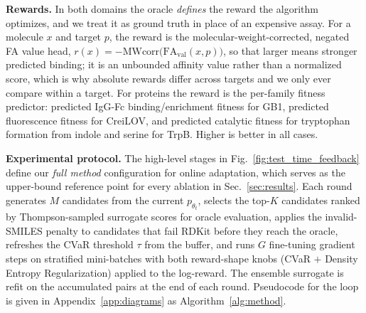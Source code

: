 \textbf{Rewards.} In both domains the oracle \emph{defines} the reward the algorithm optimizes, and we treat it as ground truth in place of an expensive assay. For a molecule $x$ and target $p$, the reward is the molecular-weight-corrected, negated FA value head, $r(x) = -\mathrm{MWcorr}\bigl(\mathrm{FA}_{\text{val}}(x, p)\bigr)$, so that larger means stronger predicted binding; it is an unbounded affinity value rather than a normalized score, which is why absolute rewards differ across targets and we only ever compare within a target. For proteins the reward is the per-family fitness predictor: predicted IgG-Fc binding/enrichment fitness for GB1, predicted fluorescence fitness for CreiLOV, and predicted catalytic fitness for tryptophan formation from indole and serine for TrpB. Higher is better in all cases.


\textbf{Experimental protocol.} The high-level stages in Fig.~\ref{fig:test_time_feedback} define our \emph{full method} configuration for online adaptation, which serves as the upper-bound reference point for every ablation in Sec.~\ref{sec:results}. Each round generates $M$ candidates from the current $p_{\theta_t}$, selects the top-$K$ candidates ranked by Thompson-sampled surrogate scores for oracle evaluation, applies the invalid-SMILES penalty to candidates that fail RDKit before they reach the oracle, refreshes the CVaR threshold $\tau$ from the buffer, and runs $G$ fine-tuning gradient steps on stratified mini-batches with both reward-shape knobs (CVaR $+$ Density Entropy Regularization) applied to the log-reward. The ensemble surrogate is refit on the accumulated pairs at the end of each round. Pseudocode for the loop is given in Appendix~\ref{app:diagrams} as Algorithm~\ref{alg:method}.

